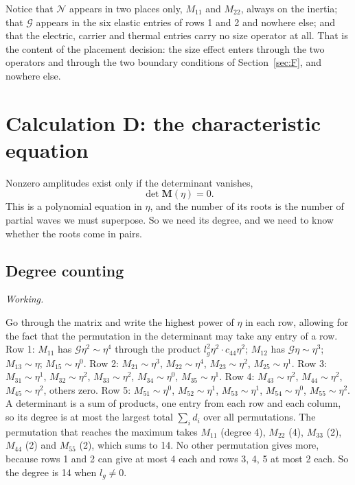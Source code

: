 \documentclass[11pt,a4paper]{article}
\newif\ifshowworked \showworkedtrue
\newenvironment{worked}{\ifshowworked\par\smallskip\noindent\textit{Working.}\par\else\setbox0\vbox\bgroup\fi}{\ifshowworked\par\smallskip\else\egroup\fi}
\newcommand{\Nc}{\mathcal{N}}
\newcommand{\Gc}{\mathcal{G}}
\begin{document}
Notice that $\Nc$ appears in two places only, $M_{11}$ and $M_{22}$, always on the inertia; that $\Gc$
appears in the six elastic entries of rows 1 and 2 and nowhere else; and that the electric, carrier and
thermal entries carry no size operator at all. That is the content of the placement decision: the size
effect enters through the two operators and through the two boundary conditions of Section~\ref{sec:F}, and
nowhere else.

\section{Calculation D: the characteristic equation}\label{sec:D}

Nonzero amplitudes exist only if the determinant vanishes,
\begin{equation}\label{eq:char}
\det\mathbf M(\eta)=0 .
\end{equation}
This is a polynomial equation in $\eta$, and the number of its roots is the number of partial waves we must
superpose. So we need its degree, and we need to know whether the roots come in pairs.

\subsection{Degree counting}

\begin{worked}
Go through the matrix and write the highest power of $\eta$ in each row, allowing for the fact that the
permutation in the determinant may take any entry of a row.
Row 1: $M_{11}$ has $\Gc\eta^2\sim\eta^4$ through the product $l_g^2\eta^2\cdot c_{44}\eta^2$; $M_{12}$ has
$\Gc\eta\sim\eta^3$; $M_{13}\sim\eta$; $M_{15}\sim\eta^0$.
Row 2: $M_{21}\sim\eta^3$, $M_{22}\sim\eta^4$, $M_{23}\sim\eta^2$, $M_{25}\sim\eta^1$.
Row 3: $M_{31}\sim\eta^1$, $M_{32}\sim\eta^2$, $M_{33}\sim\eta^2$, $M_{34}\sim\eta^0$, $M_{35}\sim\eta^1$.
Row 4: $M_{43}\sim\eta^2$, $M_{44}\sim\eta^2$, $M_{45}\sim\eta^2$, others zero.
Row 5: $M_{51}\sim\eta^0$, $M_{52}\sim\eta^1$, $M_{53}\sim\eta^1$, $M_{54}\sim\eta^0$, $M_{55}\sim\eta^2$.
A determinant is a sum of products, one entry from each row and each column, so its degree is at most the
largest total $\sum_i d_i$ over all permutations. The permutation that reaches the maximum takes
$M_{11}$ (degree 4), $M_{22}$ (4), $M_{33}$ (2), $M_{44}$ (2) and $M_{55}$ (2), which sums to 14. No other
permutation gives more, because rows 1 and 2 can give at most 4 each and rows 3, 4, 5 at most 2 each. So the
degree is 14 when $l_g\ne0$.
\end{worked}
\end{document}
